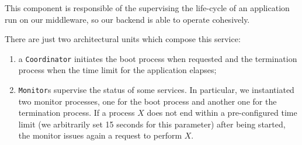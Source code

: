 
This component is responsible of the supervising the life-cycle of an
application run on our middleware, so our backend is able to operate
cohesively.

There are just two architectural units which compose this service:

\begin{enumerate}
\item a \texttt{Coordinator} initiates the boot process when requested and the
  termination process when the time limit for the application elapses;
\item \texttt{Monitor}s supervise the status of some services. In
  particular, we instantiated two monitor processes, one for the boot process
  and another one for the termination process. If a process $X$ does not end
  within a pre-configured time limit (we arbitrarily set 15 seconds for this
  parameter) after being started, the monitor issues again a request to
  perform $X$.
\end{enumerate}
